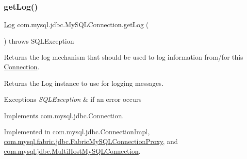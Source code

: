 \mbox{\label{interfacecom_1_1mysql_1_1jdbc_1_1_my_s_q_l_connection_a3faf787772351caedf8e95f28c09c4cd}} 
\subsubsection{\texorpdfstring{get\+Log()}{getLog()}}
{\footnotesize\ttfamily \mbox{\hyperlink{interfacecom_1_1mysql_1_1jdbc_1_1log_1_1_log}{Log}} com.\+mysql.\+jdbc.\+My\+S\+Q\+L\+Connection.\+get\+Log (\begin{DoxyParamCaption}{ }\end{DoxyParamCaption}) throws S\+Q\+L\+Exception}

Returns the log mechanism that should be used to log information from/for this \mbox{\hyperlink{interfacecom_1_1mysql_1_1jdbc_1_1_connection}{Connection}}.

\begin{DoxyReturn}{Returns}
the Log instance to use for logging messages. 
\end{DoxyReturn}

\begin{DoxyExceptions}{Exceptions}
{\em S\+Q\+L\+Exception} & if an error occurs \\
\hline
\end{DoxyExceptions}


Implements \mbox{\hyperlink{interfacecom_1_1mysql_1_1jdbc_1_1_connection_a1cca3272f995742c608a1646e1433704}{com.\+mysql.\+jdbc.\+Connection}}.



Implemented in \mbox{\hyperlink{classcom_1_1mysql_1_1jdbc_1_1_connection_impl_ae8304e8374b4789fe5f73120bccb7143}{com.\+mysql.\+jdbc.\+Connection\+Impl}}, \mbox{\hyperlink{classcom_1_1mysql_1_1fabric_1_1jdbc_1_1_fabric_my_s_q_l_connection_proxy_afacff16399aa5929d17910a44c76ee96}{com.\+mysql.\+fabric.\+jdbc.\+Fabric\+My\+S\+Q\+L\+Connection\+Proxy}}, and \mbox{\hyperlink{classcom_1_1mysql_1_1jdbc_1_1_multi_host_my_s_q_l_connection_aa844db76fbc95ba7a185cf4df1257800}{com.\+mysql.\+jdbc.\+Multi\+Host\+My\+S\+Q\+L\+Connection}}.

